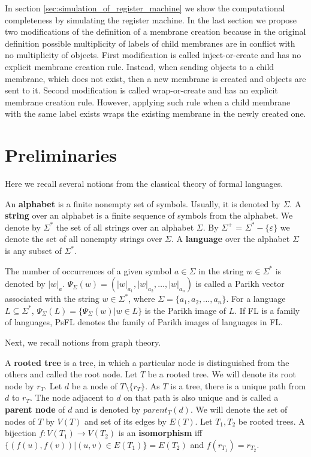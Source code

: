 \documentclass[submission,copyright,creativecommons]{../lib/lncs/llncs}
\def\eps{\varepsilon}
\begin{document}
In section \ref{sec:simulation_of_register_machine} we show the computational completeness by simulating the register machine. In the last section we propose two modifications of the definition of a membrane creation because in the original definition possible multiplicity of labels of child membranes are in conflict with no multiplicity of objects. First modification is called inject-or-create and has no explicit membrane creation rule. Instead, when sending objects to a child membrane, which does not exist, then a new membrane is created and objects are sent to it. Second modification is called wrap-or-create and has an explicit membrane creation rule. However, applying such rule when a child membrane with the same label exists wraps the existing membrane in the newly created one.

\section{Preliminaries}
\label{sec:preliminaries}

Here we recall several notions from the classical theory of formal languages.

An {\bf alphabet} is a finite nonempty set of symbols. Usually, it is denoted by $\Sigma$. A {\bf string} over an alphabet is a finite sequence of symbols from the alphabet. We denote by $\Sigma^*$ the set of all strings over an alphabet $\Sigma$. By $\Sigma^+$ = $\Sigma^* - \{\eps\}$ we denote the set of all nonempty strings over $\Sigma$. A {\bf language} over the alphabet $\Sigma$ is any subset of $\Sigma^*$.

The number of occurrences of a given symbol $a\in \Sigma$ in the string $w\in \Sigma^*$ is denoted by $|w|_a$. $\Psi_\Sigma(w)=(|w|_{a_1},|w|_{a_2},\dots,|w|_{a_n})$ is called a Parikh vector associated with the string $w\in \Sigma^*$, where $\Sigma=\{a_1,a_2,\dots, a_n\}$. For a language $L\subseteq \Sigma^*$, $\Psi_\Sigma(L)=\{\Psi_\Sigma(w)|w\in L\}$ is the Parikh image of $L$. If FL is a family of languages, PsFL denotes the family of Parikh images of languages in FL.

Next, we recall notions from graph theory.

A {\bf rooted tree} is a tree, in which a particular node is distinguished from the others and called the root node.
Let $T$ be a rooted tree. We will denote its root node by $r_T$.
Let $d$ be a node of $T\setminus\{r_T\}$.
As $T$ is a tree, there is a unique path from $d$ to $r_T$. 
The node adjacent to $d$ on that path is also unique and is called a {\bf parent node} of $d$ and is denoted by $parent_T(d)$.
We will denote the set of nodes of $T$ by $V(T)$ and set of its edges by $E(T)$.
Let $T_1, T_2$ be rooted trees. A bijection $f: V(T_1)\rightarrow V(T_2)$ is an {\bf isomorphism} iff $\{(f(u),f(v))|(u,v)\in E(T_1)\} = E(T_2)$ and $f(r_{T_1}) = r_{T_2}$. 
\end{document}
